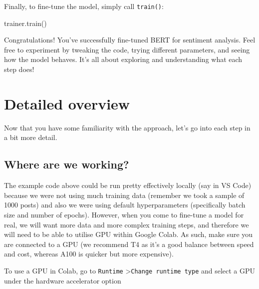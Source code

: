 \documentclass[
  letterpaper,
  DIV=11,
  numbers=noendperiod]{scrreprt}
\newenvironment{Shaded}{\begin{snugshade}}{\end{snugshade}}
\newcommand{\NormalTok}[1]{\textcolor[rgb]{0.00,0.23,0.31}{#1}}
\begin{document}
Finally, to fine-tune the model, simply call \texttt{train()}:

\begin{Shaded}
\begin{Highlighting}[]
\NormalTok{trainer.train()}
\end{Highlighting}
\end{Shaded}

Congratulations! You've successfully fine-tuned BERT for sentiment
analysis. Feel free to experiment by tweaking the code, trying different
parameters, and seeing how the model behaves. It's all about exploring
and understanding what each step does!

\section{Detailed overview}\label{detailed-overview-1}

Now that you have some familiarity with the approach, let's go into each
step in a bit more detail.

\subsection{Where are we working?}\label{where-are-we-working}

The example code above could be run pretty effectively locally (say in
VS Code) because we were not using much training data (remember we took
a sample of 1000 posts) and also we were using default hyperparameters
(specifically batch size and number of epochs). However, when you come
to fine-tune a model for real, we will want more data and more complex
training steps, and therefore we will need to be able to utilise GPU
within Google Colab. As such, make sure you are connected to a GPU (we
recommend T4 as it's a good balance between speed and cost, whereas A100
is quicker but more expensive).

\begin{tcolorbox}[enhanced jigsaw, opacitybacktitle=0.6, breakable, title=\textcolor{quarto-callout-tip-color}{\faLightbulb}\hspace{0.5em}{How do I do this?}, arc=.35mm, colframe=quarto-callout-tip-color-frame, colbacktitle=quarto-callout-tip-color!10!white, left=2mm, bottomrule=.15mm, opacityback=0, toprule=.15mm, bottomtitle=1mm, toptitle=1mm, titlerule=0mm, leftrule=.75mm, colback=white, rightrule=.15mm, coltitle=black]

To use a GPU in Colab, go to \texttt{Runtime}
\textgreater{}\texttt{Change\ runtime\ type} and select a GPU under the
hardware accelerator option

\end{tcolorbox}
\end{document}
